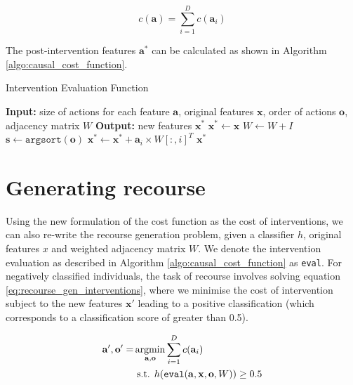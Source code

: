 \begin{equation}
	c(\mathbf{a}) = \sum_{i=1}^D c(\mathbf{a}_i)
\end{equation}

The post-intervention features $\mathbf{a}^*$ can be calculated as shown in Algorithm \ref{algo:causal_cost_function}.

\begin{algorithm}
	\caption{Intervention Evaluation Function}
	\begin{algorithmic}[1]
			\State \textbf{Input:} size of actions for each feature $\mathbf{a}$, original features $\mathbf{x}$, order of actions $\mathbf{o}$, adjacency matrix $W$
			\State \textbf{Output:} new features $\textbf{x}^*$
			\State $\textbf{x}^* \leftarrow \textbf{x}$
			\State $W \leftarrow W + I$ 
			\State $\mathbf{s} \leftarrow \texttt{argsort}(\mathbf{o})$
				\State $\textbf{x}^* \leftarrow \textbf{x}^* + \mathbf{a}_i \times W[:,i]^{T}$ 
			\EndFor
			\State \Return $\mathbf{x}^*$
		\EndFunction
	\end{algorithmic}
	\label{algo:causal_cost_function}
\end{algorithm}

\section{Generating recourse}

Using the new formulation of the cost function as the cost of interventions, we can also re-write the recourse generation problem, given a classifier $h$, original features $x$ and weighted adjacency matrix $W$. We denote the intervention evaluation as described in Algorithm \ref{algo:causal_cost_function} as \texttt{eval}. For negatively classified individuals, the task of recourse involves solving equation \ref{eq:recourse_gen_interventions}, where we minimise the cost of intervention subject to the new features $\mathbf{x}'$ leading to a positive classification (which corresponds to a classification score of greater than 0.5).

\begin{align} \label{eq:recourse_gen_interventions}
	\mathbf{a}', \mathbf{o}' = & \operatorname*{argmin}_{\mathbf{a, o}} \sum_{i=1}^D c(\mathbf{a}_i) \\ \nonumber
	& \text{ s.t. } h(\texttt{eval}(\mathbf{a, x, o}, W)) \geq 0.5
\end{align}

